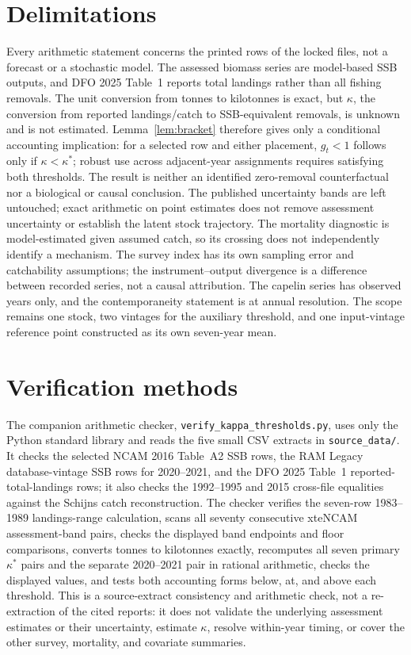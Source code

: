 \documentclass[10pt,twocolumn]{article}
\theoremstyle{plain}
\theoremstyle{remark}
\begin{document}
\section{Delimitations}\label{scope}

Every arithmetic statement concerns the printed rows of the locked
files, not a forecast or a stochastic model. The assessed biomass
series are model-based SSB outputs, and DFO 2025 Table~1 reports total
landings rather than all fishing removals. The unit conversion from
tonnes to kilotonnes is exact, but \(\kappa\), the conversion from
reported landings/catch to SSB-equivalent removals, is unknown and is
not estimated. Lemma~\ref{lem:bracket} therefore gives only a
conditional accounting implication: for a selected row and either
placement, \(g_t<1\) follows only if \(\kappa<\kappa^*\); robust use
across adjacent-year assignments requires satisfying both thresholds.
The result is neither an identified zero-removal counterfactual nor a
biological or causal conclusion. The published uncertainty bands are
left untouched; exact arithmetic on point estimates does not remove
assessment uncertainty or establish the latent stock trajectory. The
mortality diagnostic is model-estimated given assumed catch, so its
crossing does not independently identify a mechanism. The survey index
has its own sampling error and catchability assumptions; the
instrument--output divergence is a difference between recorded series,
not a causal attribution. The capelin series has observed years only,
and the contemporaneity statement is at annual resolution. The scope
remains one stock, two vintages for the auxiliary threshold, and one
input-vintage reference point constructed as its own seven-year mean.

\section{Verification methods}\label{methods}

The companion arithmetic checker,
\texttt{verify\_kappa\_thresholds.py}, uses only the Python
standard library and reads the five small CSV extracts in
\texttt{source\_data/}. It checks the selected NCAM 2016 Table~A2 SSB
rows, the RAM Legacy database-vintage SSB rows for 2020--2021, and the
DFO 2025 Table~1 reported-total-landings rows; it also checks the
1992--1995 and 2015 cross-file equalities against the Schijns catch
reconstruction. The checker verifies the seven-row 1983--1989
landings-range calculation, scans all seventy consecutive xteNCAM
assessment-band pairs, checks the displayed band endpoints and floor
comparisons, converts tonnes to kilotonnes exactly, recomputes all seven
primary \(\kappa^*\) pairs and the separate 2020--2021 pair in rational
arithmetic, checks the displayed values, and tests both accounting
forms below, at, and above each threshold. This is a source-extract
consistency and arithmetic check, not a re-extraction of the cited
reports: it does not validate the underlying assessment estimates or
their uncertainty, estimate \(\kappa\), resolve within-year timing, or
cover the other survey, mortality, and covariate summaries.
\end{document}

